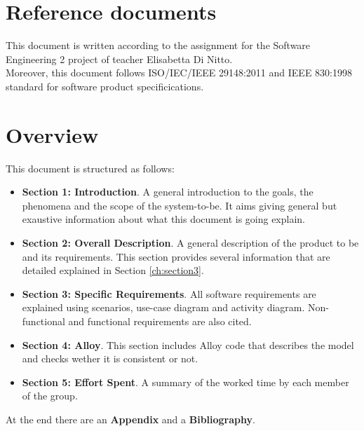 \section{Reference documents}
This document is written according to the assignment for the Software Engineering 2 project \cite{se-assignments} of teacher Elisabetta Di Nitto.\\
Moreover, this document follows ISO/IEC/IEEE 29148:2011 \cite{ieee-29148} and IEEE 830:1998 \cite{ieee-830} standard for software product specificications.

\section{Overview}
This document is structured as follows:
\begin{itemize}
  \setlength{\itemindent}{-.4in}
  \item[] \textbf{Section 1: Introduction}. A general introduction to the goals, the phenomena and the scope of the system-to-be. It aims giving general but exaustive information about what this document is going explain.
  \item[] \textbf{Section 2: Overall Description}. A general description of the product to be and its requirements. This section provides several information that are detailed explained in Section \ref{ch:section3}.
  \item[] \textbf{Section 3: Specific Requirements}. All software requirements are explained using scenarios, use-case diagram and activity diagram. Non-functional and functional requirements are also cited.
  \item[] \textbf{Section 4: Alloy}. This section includes Alloy code that describes the model and checks wether it is consistent or not.
  \item[] \textbf{Section 5: Effort Spent}. A summary of the worked time by each member of the group.
\end{itemize}
At the end there are an \textbf{Appendix} and a \textbf{Bibliography}.
